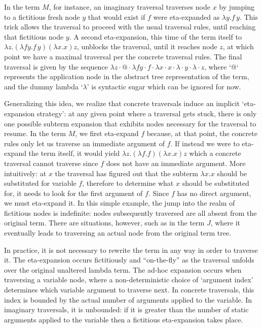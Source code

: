 \documentclass{elsarticle}
\theoremstyle{plain}
\theoremstyle{definition}
\begin{document}
In the term $M$, for instance, an imaginary traversal traverses node $x$ by jumping to a fictitious fresh node $y$ that would exist if $f$ were eta-expanded
as $\lambda y.f\, y$. This trick allows the traversal to proceed with the usual traversal rules, until reaching that fictitious node $y$.
A second eta-expansion, this time of the term itself to
$\lambda z. (\lambda f y.f\, y)(\lambda x.x) z$,
unblocks the traversal, until it reaches node $z$, at which point we have a maximal traversal per the concrete traversal rules. The final traversal is given by the sequence $\lambda z \cdot @ \cdot \lambda f y \cdot f \cdot \lambda x \cdot x \cdot \lambda \cdot y \cdot \lambda \cdot z$, where `@` represents the application node in the abstract tree representation of the term, and the dummy lambda `$\lambda$' is syntactic sugar which can be ignored for now.

Generalizing this idea, we realize that concrete traversals induce an implicit `eta-expansion strategy': at any given point where a traversal gets stuck, there is only one possible subterm expansion that exhibits nodes necessary for the traversal to resume. In the term $M$, we first eta-expand $f$ because, at that point, the concrete rules only let us
traverse an immediate argument of $f$. If instead we were to eta-expand the term itself, it would yield $\lambda z. (\lambda f .f)(\lambda x.x) z$
which a concrete traversal cannot traverse since $f$ does not have an immediate argument. More intuitively: at $x$ the traversal has figured out that the subterm $\lambda x.x$ should be substituted for variable $f$, therefore to determine what $x$ should be substituted for, it needs to look for the first argument of $f$. Since $f$ has no direct argument, we must eta-expand it. In this simple example, the jump into the realm of fictitious nodes is indefinite: nodes subsequently traversed are all absent from the original term. There are situations, however, such as in the term $J$, where it eventually leads to traversing an actual node from the original term tree.

In practice, it is not necessary to rewrite the term in any way in order to traverse it.
The eta-expansion occurs fictitiously and ``on-the-fly'' as the traversal unfolds over the original unaltered lambda term.
The ad-hoc expansion occurs when traversing a variable node, where a non-deterministic choice of `argument index' determines which variable argument to traverse next. In concrete traversals, this index is bounded by the actual number of arguments applied to the variable. In imaginary traversals, it is unbounded: if it is greater than the number of static arguments applied to the variable then a fictitious eta-expansion takes place.
\end{document}
